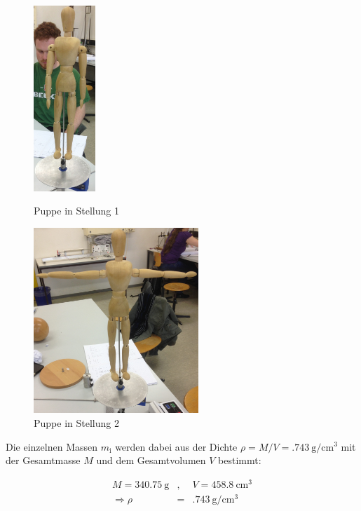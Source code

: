 				\begin{figure}[h]
					\begin{minipage}[t]{7cm}
						\vspace{0pt}
						\centering
						\includegraphics[height = 7cm]{img/pupp1.jpg}
						\caption{Puppe in Stellung 1}
						\label{fig:puppe1}
					\end{minipage}
					\hfill
					\begin{minipage}[t]{7cm}
						\vspace{0pt}
						\centering
						\includegraphics[height = 7cm]{img/pupp2.jpg}
						\caption{Puppe in Stellung 2}
						\label{fig:puppe2}
					\end{minipage}
				\end{figure}

				Die einzelnen Massen $m_\mathrm{i}$ werden dabei aus der Dichte $\rho = M / V = \SI{.743}{\gram \per \centi \meter \cubed}$ mit der Gesamtmasse $M$ und dem Gesamtvolumen $V$ bestimmt:

				\begin{eqnarray*}
					M = \SI{340.75}{\gram} & , & V = \SI{458.8}{\centi \meter \cubed} \\
					\Rightarrow \rho & = & \SI{.743}{\gram \per \centi \meter \cubed}
				\end{eqnarray*}

